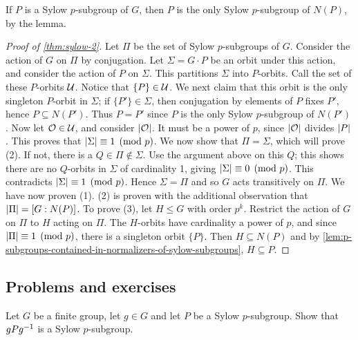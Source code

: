 \documentclass[./main.tex]{subfiles}
\begin{document}
If $P$ is a Sylow $p$-subgroup of $G$, then $P$ is the only Sylow
$p$-subgroup of $N(P)$, by the lemma. 


\begin{proof}[Proof of \cref{thm:sylow-2}]
    Let $\Pi$ be the set of Sylow $p$-subgroups of $G$. Consider the action of
    $G$ on $\Pi$ by conjugation. Let $\Sigma = G \cdot P$ be an orbit under this
    action, and consider the action of $P$ on $\Sigma$. This partitions $\Sigma$
    into $P$-orbits. Call the set of these $P$-orbits $\mathcal{U}$. Notice that
    $\{P\} \in \mathcal{U}$. We next claim that this orbit is the only singleton
    $P$-orbit in $\Sigma$; if $\{ P'\} \in \Sigma$, then conjugation by elements
    of $P$ fixes $P'$, hence $P \subseteq N(P')$. Thus $P = P'$ since $P$ is the
    only Sylow $p$-subgroup of $N(P')$. Now let $\mathcal{O} \in \mathcal{U}$, and consider
    $\abs {\mc O}$. It must be a power of $p$, since $\abs{\mc O}$ divides $\abs
    P$. This proves that $\abs{\Sigma} \equiv 1 \pmod p$. We now show that $\Pi
    = \Sigma$, which will prove (2). If not, there is a $Q \in \Pi \not\in
    \Sigma$. Use the argument above on this $Q$; this shows there are no
    $Q$-orbits in $\Sigma$ of cardinality 1, giving $\abs{\Sigma} \equiv 0 \pmod
    p$. This contradicts $\abs{\Sigma} \equiv 1 \pmod p$. Hence $\Sigma = \Pi$
    and so $G$ acts transitively on $\Pi$. We have now proven (1). (2) is proven
    with the additional observation that $\abs{\Pi} = [G:N(P)]$. To prove (3),
    let $H \leq G$ with order $p^k$. Restrict the action of $G$ on $\Pi$ to $H$
    acting on $\Pi$. The $H$-orbits have cardinality a power of $p$, and since
    $\abs{\Pi} \equiv 1 \pmod p$, there is a singleton orbit $\{P\}$. Then $H
    \subseteq N(P)$ and by
    \cref{lem:p-subgroups-contained-in-normalizers-of-sylow-subgroups}, $H
    \subseteq P$.
\end{proof}





\subsection{Problems and exercises}
\begin{exercise}
\label{ex:conjugate-of-sylow-subgroup}
    Let $G$ be a finite group, let $g \in G$ and let $P$ be a Sylow
    $p$-subgroup. Show that $gPg^{-1}$ is a Sylow $p$-subgroup.
\end{exercise}
\end{document}
